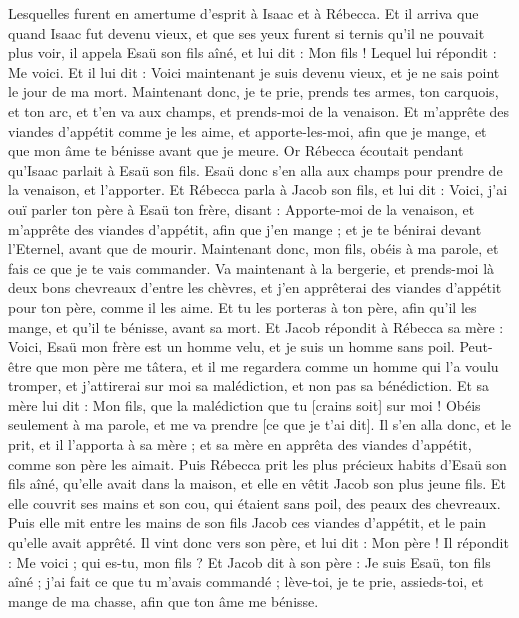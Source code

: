 \begin{multicols}{2}
Lesquelles furent en amertume d'esprit à Isaac et à Rébecca.
\VerseOne{}Et il arriva que quand Isaac fut devenu vieux, et que ses yeux furent si ternis qu'il ne pouvait plus voir, il appela Esaü son fils aîné, et lui dit : Mon fils ! Lequel lui répondit : Me voici.
Et il lui dit : Voici maintenant je suis devenu vieux, et je ne sais point le jour de ma mort.
Maintenant donc, je te prie, prends tes armes, ton carquois, et ton arc, et t'en va aux champs, et prends-moi de la venaison.
Et m'apprête des viandes d'appétit comme je les aime, et apporte-les-moi, afin que je mange, et que mon âme te bénisse avant que je meure.
Or Rébecca écoutait pendant qu'Isaac parlait à Esaü son fils. Esaü donc s'en alla aux champs pour prendre de la venaison, et l'apporter.
Et Rébecca parla à Jacob son fils, et lui dit : Voici, j'ai ouï parler ton père à Esaü ton frère, disant :
Apporte-moi de la venaison, et m'apprête des viandes d'appétit, afin que j'en mange ; et je te bénirai devant l'Eternel, avant que de mourir.
Maintenant donc, mon fils, obéis à ma parole, et fais ce que je te vais commander.
Va maintenant à la bergerie, et prends-moi là deux bons chevreaux d'entre les chèvres, et j'en apprêterai des viandes d'appétit pour ton père, comme il les aime.
Et tu les porteras à ton père, afin qu'il les mange, et qu'il te bénisse, avant sa mort.
Et Jacob répondit à Rébecca sa mère : Voici, Esaü mon frère est un homme velu, et je suis un homme sans poil.
Peut-être que mon père me tâtera, et il me regardera comme un homme qui l'a voulu tromper, et j'attirerai sur moi sa malédiction, et non pas sa bénédiction.
Et sa mère lui dit : Mon fils, que la malédiction que tu [crains soit] sur moi ! Obéis seulement à ma parole, et me va prendre [ce que je t'ai dit].
Il s'en alla donc, et le prit, et il l'apporta à sa mère ; et sa mère en apprêta des viandes d'appétit, comme son père les aimait.
Puis Rébecca prit les plus précieux habits d'Esaü son fils aîné, qu'elle avait dans la maison, et elle en vêtit Jacob son plus jeune fils.
Et elle couvrit ses mains et son cou, qui étaient sans poil, des peaux des chevreaux.
Puis elle mit entre les mains de son fils Jacob ces viandes d'appétit, et le pain qu'elle avait apprêté.
Il vint donc vers son père, et lui dit : Mon père ! Il répondit : Me voici ; qui es-tu, mon fils ?
Et Jacob dit à son père : Je suis Esaü, ton fils aîné ; j'ai fait ce que tu m'avais commandé ; lève-toi, je te prie, assieds-toi, et mange de ma chasse, afin que ton âme me bénisse.

\end{multicols}
